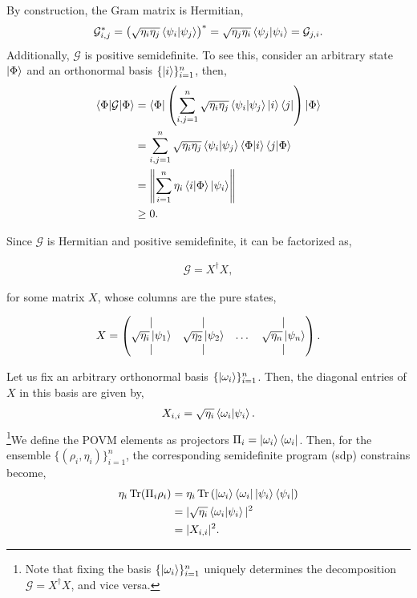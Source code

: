 \documentclass[12pt,letterpaper]{article}
\DeclareMathOperator{\tr}{Tr}
\begin{document}
By construction, the Gram matrix is Hermitian,
\begin{align*}
	\mathcal{G}_{i,j}^* = \left( \sqrt{\eta_i\eta_j}\braket{\psi_i|\psi_j}\right)^* =  \sqrt{\eta_j\eta_i}\braket{\psi_j|\psi_i} = \mathcal{G}_{j,i}.
\end{align*}
Additionally, $\mathcal{G}$ is positive semidefinite. To see this, consider an arbitrary state $\ket{\Phi}$ and an orthonormal basis $\{\ket{i}\}_{i=1}^n$, then,
\begin{align*}
	\braket{\Phi|\mathcal{G}|\Phi} &= \braket{\Phi| \left( \sum_{i,j=1}^{n} \sqrt{\eta_i\eta_j}\braket{\psi_i|\psi_j} \ket{i}\bra{j} \right) |\Phi} \\
	&= \sum_{i,j=1}^{n} \sqrt{\eta_i\eta_j}\braket{\psi_i|\psi_j} \braket{\Phi|i} \braket{j|\Phi} \\
	&= \left\| \sum_{i=1}^{n} \eta_i\braket{i|\Phi} \ket{\psi_i} \right\|\\
	&\geq 0.
\end{align*}

Since $\mathcal{G}$ is Hermitian and positive semidefinite, it can be factorized as,

\begin{align*}
	\mathcal{G} = X^\dagger X,
\end{align*}

for some matrix $X$, whose columns are the pure states,

\begin{align*}
	X = \begin{pmatrix}
		\mid & \mid &        & \mid \\
		\sqrt{\eta_i}\ket{\psi_1} & \sqrt{\eta_2}\ket{\psi_2} & \dots & \sqrt{\eta_n}\ket{\psi_n} \\
		\mid & \mid &        & \mid
	\end{pmatrix}.
\end{align*}

Let us fix an arbitrary orthonormal basis $\{\ket{\omega_i}\}_{i=1}^n$. Then, the diagonal entries of $X$ in this basis are given by,
\begin{align*}
	X_{i,i} = \sqrt{\eta_i}\braket{\omega_i|\psi_i}.
\end{align*}
\footnote{Note that fixing the basis $\{\ket{\omega_i}\}_{i=1}^n$ uniquely determines the decomposition $\mathcal{G} = X^\dagger X$, and vice versa.}We define the POVM elements as projectors $\Pi_i = \ket{\omega_i}\bra{\omega_i}$. Then, for the ensemble $\{(\rho_i, \eta_i)\}_{i=1}^n$, the corresponding semidefinite program (\gls{sdp}) constrains become,
\begin{align*}
	\eta_i\tr(\Pi_i \rho_i) &= \eta_i\tr\left( \ket{\omega_i}\bra{\omega_i} \ket{\psi_i}\bra{\psi_i} \right) \\
	&= |\sqrt{\eta_i}\braket{\omega_i|\psi_i}|^2 \\
	&= |X_{i,i}|^2.
\end{align*}
\end{document}

